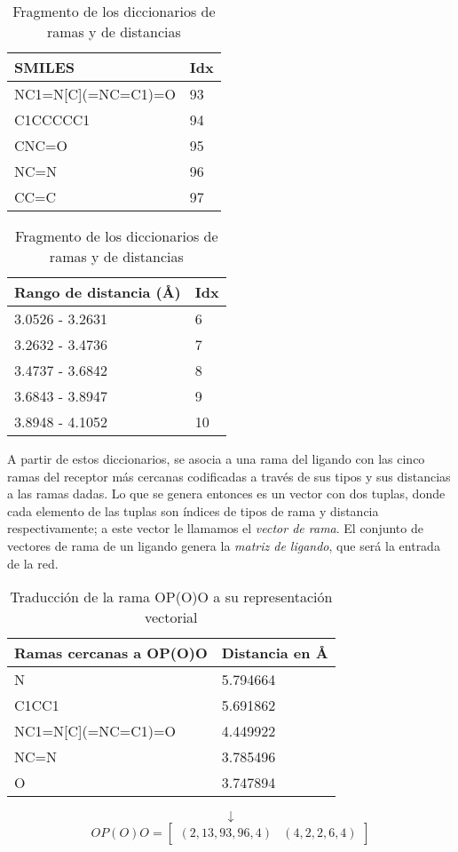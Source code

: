 \begin{table}[H]
  \begin{center}
    \begin{tabular}{l|l}
      SMILES                 & Idx \\ \hline
      NC1=N{[}C{]}(=NC=C1)=O & 93 \\
      C1CCCCC1               & 94 \\
      CNC=O                  & 95 \\
      NC=N                   & 96 \\
      CC=C                   & 97
    \end{tabular}
    \begin{tabular}{l|l}
      Rango de distancia (\AA) & Idx \\ \hline
      3.0526 - 3.2631        & 6   \\
      3.2632 - 3.4736        & 7   \\
      3.4737 - 3.6842        & 8   \\
      3.6843 - 3.8947        & 9   \\
      3.8948 - 4.1052        & 10
    \end{tabular}
  \end{center}
  \caption{Fragmento de los diccionarios de ramas y de distancias}
  \label{fig:dictionary}
\end{table}

A partir de estos diccionarios, se asocia a una rama del ligando con
las cinco ramas del receptor más cercanas codificadas a través de sus
tipos y sus distancias a las ramas dadas. Lo que se genera entonces es
un vector con dos tuplas, donde cada elemento de las tuplas son
índices de tipos de rama y distancia respectivamente; a este vector le
llamamos el \textit{vector de rama}. El conjunto de vectores de rama
de un ligando genera la \textit{matriz de ligando}, que será la
entrada de la red.

\begin{table}[H]
  \begin{center}
  \begin{tabular}{l|l}
    Ramas cercanas a OP(O)O & Distancia en \AA \\ \hline N & 5.794664 \\ C1CC1 & 5.691862
    \\ NC1=N{[}C{]}(=NC=C1)=O & 4.449922 \\ NC=N & 3.785496 \\ O &
    3.747894
  \end{tabular}
  \end{center}
  \begin{equation*}
  \downarrow
  \end{equation*}
  \begin{equation*}
    OP(O)O=\begin{bmatrix}
    (2, 13, 93, 96, 4) & (4, 2, 2, 6, 4)
    \end{bmatrix}
  \end{equation*}
  \caption{Traducción de la rama OP(O)O a su representación vectorial}
\end{table}

